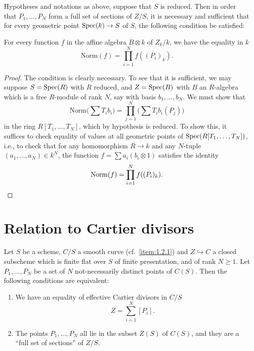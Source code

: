 \begin{corollary}\label{cor:1.9.2}
Hypotheses and notations as above, suppose that $S$ is reduced. Then in order that $P_1, \dots, P_N$ form a full set of sections of $Z/S$, it is necessary and sufficient that for every geometric point $\operatorname{Spec}(k) \to S$ of $S$, the following condition be satisfied:
\par
For every function $f$ in the affine algebra $B \otimes k$ of $Z_k/k$, we have the equality in $k$
\[
\mathrm{Norm}(f) = \prod_{i=1}^N f((P_i)_k).
\]
\end{corollary}

\begin{proof}
The condition is clearly necessary. To see that it is sufficient, we may suppose $S = \operatorname{Spec}(R)$ with $R$ reduced, and $Z = \operatorname{Spec}(B)$ with $B$ an $R$-algebra which is a free $R$-module of rank $N$, say with basis $b_1, \dots, b_N$. We must show that
\[
\mathrm{Norm}\Biggl( \sum T_i b_i \Biggr) = \prod_{j=1}^N \Biggl( \sum T_i b_i(P_j) \Biggr)
\]
in the ring $R[T_1, \dots, T_N]$, which by hypothesis is reduced. To show this, it suffices to check equality of values at all geometric points of $\operatorname{Spec}(R[T_1, \dots, T_N])$, i.e., to check that for any homomorphism $R \to k$ and any $N$-tuple $(a_1, \dots, a_N) \in k^N$, the function $f = \sum a_i(b_i \otimes 1)$ satisfies the identity
\[
\mathrm{Norm}(f) = \prod_{i=1}^N f((P_i)_k). \qedhere
\]
\end{proof}

\section{Relation to Cartier divisors}\label{sec:1.10}

\begin{theorem}\label{thm:1.10.1}
Let $S$ be a scheme, $C/S$ a smooth curve (cf.~\ref{item:1.2.1}) and $Z \hookrightarrow C$ a closed subscheme which is finite flat over $S$ of finite presentation, and of rank $N \ge 1$. Let $P_1, \dots, P_N$ be a set of $N$ not-necessarily distinct points of $C(S)$. Then the following conditions are equivalent:
\begin{enumerate}[(1)]
\item We have an equality of effective Cartier divisors in $C/S$
\[
Z = \sum_{i=1}^N [P_i].
\]
\item The points $P_1, \dots, P_N$ all lie in the subset $Z(S)$ of $C(S)$, and they are a ``full set of sections'' of $Z/S$.
\end{enumerate}
\end{theorem}

